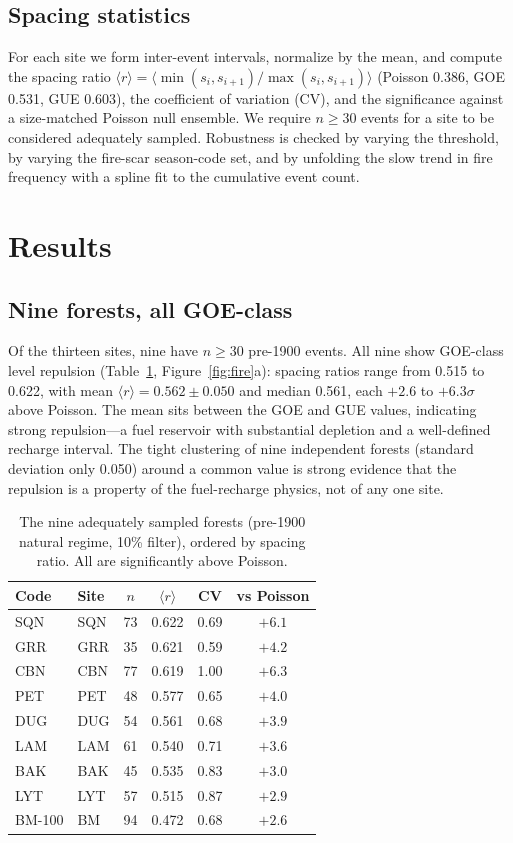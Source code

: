 \documentclass[12pt,a4paper]{article}
\begin{document}
\subsection{Spacing statistics}
For each site we form inter-event intervals, normalize by the mean, and compute the spacing ratio $\langle r\rangle=\langle\min(s_i,s_{i+1})/\max(s_i,s_{i+1})\rangle$ (Poisson 0.386, GOE 0.531, GUE 0.603), the coefficient of variation (CV), and the significance against a size-matched Poisson null ensemble. We require $n\ge30$ events for a site to be considered adequately sampled. Robustness is checked by varying the threshold, by varying the fire-scar season-code set, and by unfolding the slow trend in fire frequency with a spline fit to the cumulative event count.

\section{Results}
\subsection{Nine forests, all GOE-class}
Of the thirteen sites, nine have $n\ge30$ pre-1900 events. All nine show GOE-class level repulsion (Table~\ref{tab:sites}, Figure~\ref{fig:fire}a): spacing ratios range from 0.515 to 0.622, with mean $\langle r\rangle = 0.562 \pm 0.050$ and median 0.561, each $+2.6$ to $+6.3\sigma$ above Poisson. The mean sits between the GOE and GUE values, indicating strong repulsion---a fuel reservoir with substantial depletion and a well-defined recharge interval. The tight clustering of nine independent forests (standard deviation only 0.050) around a common value is strong evidence that the repulsion is a property of the fuel-recharge physics, not of any one site.

\begin{table}[H]
\centering
\caption{The nine adequately sampled forests (pre-1900 natural regime, 10\% filter), ordered by spacing ratio. All are significantly above Poisson.}
\label{tab:sites}
\small
\begin{tabular}{llcccc}
\toprule
Code & Site & $n$ & $\langle r\rangle$ & CV & vs Poisson \\
\midrule
SQN & SQN & 73 & 0.622 & 0.69 & $+6.1$ \\
GRR & GRR & 35 & 0.621 & 0.59 & $+4.2$ \\
CBN & CBN & 77 & 0.619 & 1.00 & $+6.3$ \\
PET & PET & 48 & 0.577 & 0.65 & $+4.0$ \\
DUG & DUG & 54 & 0.561 & 0.68 & $+3.9$ \\
LAM & LAM & 61 & 0.540 & 0.71 & $+3.6$ \\
BAK & BAK & 45 & 0.535 & 0.83 & $+3.0$ \\
LYT & LYT & 57 & 0.515 & 0.87 & $+2.9$ \\
BM-100 & BM & 94 & 0.472 & 0.68 & $+2.6$ \\
\bottomrule
\end{tabular}
\end{table}
\end{document}
